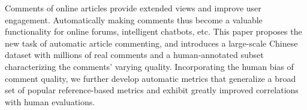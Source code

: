 Comments of online articles provide extended views and improve user engagement. Automatically making comments thus become a valuable functionality for online forums, intelligent chatbots, etc. This paper proposes the new task of automatic article commenting, and introduces a large-scale Chinese dataset with millions of real comments and a human-annotated subset characterizing the comments' varying quality. Incorporating the human bias of comment quality, we further develop automatic metrics that generalize a broad set of popular reference-based metrics and exhibit greatly improved correlations with human evaluations.
